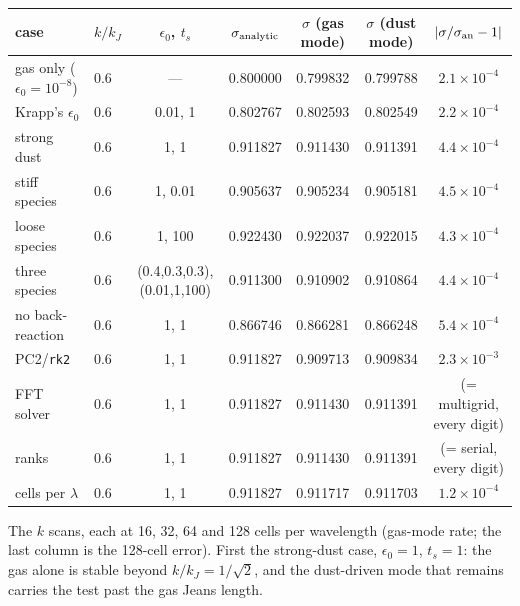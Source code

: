 \documentclass[11pt]{article}
\newcommand{\code}[1]{\texttt{#1}}
\begin{document}
\begin{center}
\small
\begin{tabular}{@{}llccccc@{}}
\toprule
case & $k/k_J$ & $\epsilon_0$, $t_s$ & $\sigma_{\rm analytic}$ & $\sigma$ (gas mode) & $\sigma$ (dust mode) & $|\sigma/\sigma_{\rm an}-1|$ \\
\midrule
gas only ($\epsilon_0 = 10^{-8}$) & 0.6 & --- & 0.800000 & 0.799832 & 0.799788 & $2.1\times10^{-4}$ \\
Krapp's $\epsilon_0$ & 0.6 & 0.01, 1 & 0.802767 & 0.802593 & 0.802549 & $2.2\times10^{-4}$ \\
strong dust & 0.6 & 1, 1 & 0.911827 & 0.911430 & 0.911391 & $4.4\times10^{-4}$ \\
\quad stiff species & 0.6 & 1, 0.01 & 0.905637 & 0.905234 & 0.905181 & $4.5\times10^{-4}$ \\
\quad loose species & 0.6 & 1, 100 & 0.922430 & 0.922037 & 0.922015 & $4.3\times10^{-4}$ \\
\quad three species & 0.6 & (0.4,0.3,0.3), (0.01,1,100) & 0.911300 & 0.910902 & 0.910864 & $4.4\times10^{-4}$ \\
\quad no back-reaction & 0.6 & 1, 1 & 0.866746 & 0.866281 & 0.866248 & $5.4\times10^{-4}$ \\
\quad PC2/\code{rk2} & 0.6 & 1, 1 & 0.911827 & 0.909713 & 0.909834 & $2.3\times10^{-3}$ \\
\quad FFT solver & 0.6 & 1, 1 & 0.911827 & 0.911430 & 0.911391 & (= multigrid, every digit) \\
\quad 4 ranks & 0.6 & 1, 1 & 0.911827 & 0.911430 & 0.911391 & (= serial, every digit) \\
\quad 256 cells per $\lambda$ & 0.6 & 1, 1 & 0.911827 & 0.911717 & 0.911703 & $1.2\times10^{-4}$ \\
\bottomrule
\end{tabular}
\end{center}

The $k$ scans, each at 16, 32, 64 and 128 cells per wavelength (gas-mode rate; the
last column is the 128-cell error). First the strong-dust case, $\epsilon_0 = 1$,
$t_s = 1$: the gas alone is stable beyond $k/k_J = 1/\sqrt2$, and the dust-driven mode
that remains carries the test past the gas Jeans length.
\end{document}
